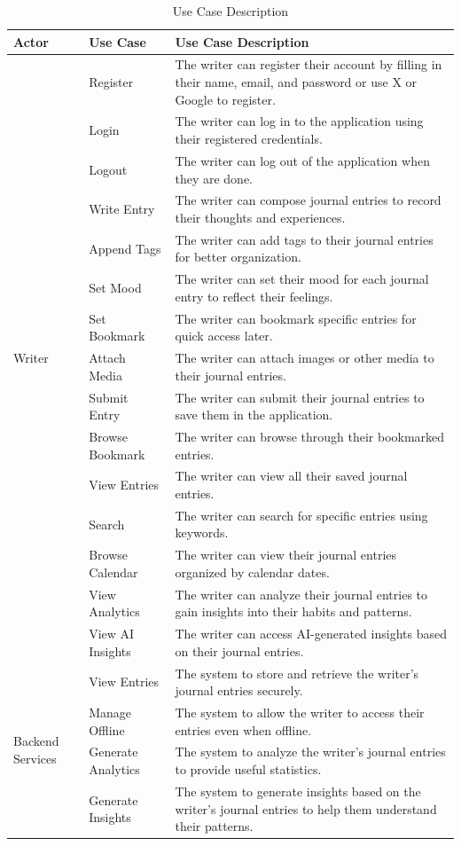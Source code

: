 \begin{table}[H]
\centering
\caption{Use Case Description}
\label{tab:usecase-description}
\begin{tabular}{|p{3cm}|p{5cm}|p{7cm}|}
\hline
\textbf{Actor} & \textbf{Use Case} & \textbf{Use Case Description} \\
\hline
\multirow{15}{*}{Writer} & Register & The writer can register their account by filling in their name, email, and password or use X or Google to register. \\
\cline{2-3}
 & Login & The writer can log in to the application using their registered credentials. \\
\cline{2-3}
 & Logout & The writer can log out of the application when they are done. \\
\cline{2-3}
 & Write Entry & The writer can compose journal entries to record their thoughts and experiences. \\
\cline{2-3}
 & Append Tags & The writer can add tags to their journal entries for better organization. \\
\cline{2-3}
 & Set Mood & The writer can set their mood for each journal entry to reflect their feelings. \\
\cline{2-3}
 & Set Bookmark & The writer can bookmark specific entries for quick access later. \\
\cline{2-3}
 & Attach Media & The writer can attach images or other media to their journal entries. \\
\cline{2-3}
 & Submit Entry & The writer can submit their journal entries to save them in the application. \\
\cline{2-3}
 & Browse Bookmark & The writer can browse through their bookmarked entries. \\
\cline{2-3}
 & View Entries & The writer can view all their saved journal entries. \\
\cline{2-3}
 & Search & The writer can search for specific entries using keywords. \\
\cline{2-3}
 & Browse Calendar & The writer can view their journal entries organized by calendar dates. \\
\cline{2-3}
 & View Analytics & The writer can analyze their journal entries to gain insights into their habits and patterns. \\
\cline{2-3}
 & View AI Insights & The writer can access AI-generated insights based on their journal entries. \\
\hline
\multirow{4}{*}{Backend Services} & View Entries & The system to store and retrieve the writer's journal entries securely. \\
\cline{2-3}
 & Manage Offline & The system to allow the writer to access their entries even when offline. \\
\cline{2-3}
 & Generate Analytics & The system to analyze the writer's journal entries to provide useful statistics. \\
\cline{2-3}
 & Generate Insights & The system to generate insights based on the writer's journal entries to help them understand their patterns. \\
\hline
\end{tabular}
\end{table}

